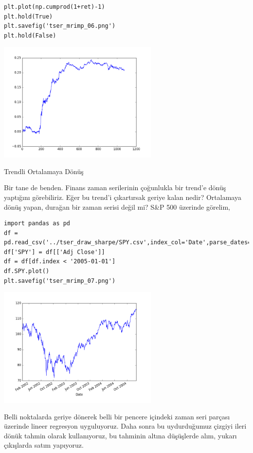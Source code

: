 \documentclass[12pt,fleqn]{article}\usepackage{../../common}
\begin{document}
\begin{verbatim}
plt.plot(np.cumprod(1+ret)-1)
plt.hold(True)
plt.savefig('tser_mrimp_06.png')
plt.hold(False)
\end{verbatim}

\includegraphics[height=6cm]{tser_mrimp_06.png}

Trendli Ortalamaya Dönüş

Bir tane de benden. Finans zaman serilerinin çoğunlukla bir trend'e dönüş
yaptığını görebiliriz. Eğer bu trend'i çıkartırsak geriye kalan nedir?
Ortalamaya dönüş yapan, durağan bir zaman serisi değil mi? S\&P 500 üzerinde
görelim,

\begin{verbatim}
import pandas as pd
df = pd.read_csv('../tser_draw_sharpe/SPY.csv',index_col='Date',parse_dates=True)
df['SPY'] = df[['Adj Close']]
df = df[df.index < '2005-01-01']
df.SPY.plot()
plt.savefig('tser_mrimp_07.png')
\end{verbatim}

\includegraphics[height=6cm]{tser_mrimp_07.png}

Belli noktalarda geriye dönerek belli bir pencere içindeki zaman seri parçası
üzerinde lineer regresyon uyguluyoruz. Daha sonra bu uydurduğumuz çizgiyi ileri
dönük tahmin olarak kullanıyoruz, bu tahminin altına düşüşlerde alım, yukarı
çıkışlarda satım yapıyoruz. 
\end{document}
